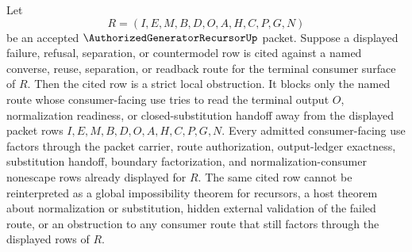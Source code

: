 \begin{corollary}
\label{cor:authorized-generator-recursor-terminal-consumer-strict-obstruction}
Let
$$
R=(I,E,M,B,D,O,A,H,C,P,G,N)
$$
be an accepted $\AuthorizedGeneratorRecursorUp$ packet. Suppose a displayed failure, refusal, separation, or countermodel row is cited against a named converse, reuse, separation, or readback route for the terminal consumer surface of $R$. Then the cited row is a strict local obstruction. It blocks only the named route whose consumer-facing use tries to read the terminal output $O$, normalization readiness, or closed-substitution handoff away from the displayed packet rows $I,E,M,B,D,O,A,H,C,P,G,N$. Every admitted consumer-facing use factors through the packet carrier, route authorization, output-ledger exactness, substitution handoff, boundary factorization, and normalization-consumer nonescape rows already displayed for $R$. The same cited row cannot be reinterpreted as a global impossibility theorem for recursors, a host theorem about normalization or substitution, hidden external validation of the failed route, or an obstruction to any consumer route that still factors through the displayed rows of $R$.
\end{corollary}
